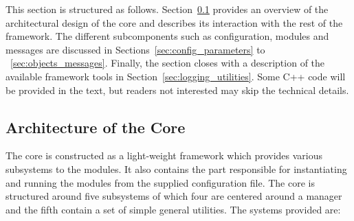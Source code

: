 This section is structured as follows.
Section~\ref{sec:arch} provides an overview of the architectural design of the core and describes its interaction with the rest of the \apsq framework.
The different subcomponents such as configuration, modules and messages are discussed in Sections~\ref{sec:config_parameters} to ~\ref{sec:objects_messages}.
Finally, the section closes with a description of the available framework tools in Section~\ref{sec:logging_utilities}.
Some C++ code will be provided in the text, but readers not interested may skip the technical details.

\subsection{Architecture of the Core}
\label{sec:arch}
The core is constructed as a light-weight framework which provides various subsystems to the modules.
It also contains the part responsible for instantiating and running the modules from the supplied configuration file.
The core is structured around five subsystems of which four are centered around a manager and the fifth contain a set of simple general utilities.
The systems provided are:
